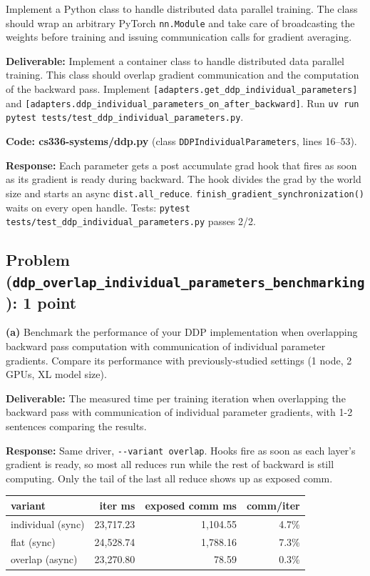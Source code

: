 \documentclass[11pt]{article}
\begin{document}
Implement a Python class to handle distributed data parallel training. The class should wrap an arbitrary PyTorch \texttt{nn.Module} and take care of broadcasting the weights before training and issuing communication calls for gradient averaging.

\textbf{Deliverable:} Implement a container class to handle distributed data parallel training. This class should overlap gradient communication and the computation of the backward pass. Implement \texttt{[adapters.get\_ddp\_individual\_parameters]} and \texttt{[adapters.ddp\_individual\_parameters\_on\_after\_backward]}. Run \texttt{uv run pytest tests/test\_ddp\_individual\_parameters.py}.

\textbf{Code: cs336-systems/ddp.py} (class \verb|DDPIndividualParameters|, lines 16--53).

\textbf{Response:} Each parameter gets a post accumulate grad hook that fires as soon as its gradient is ready during backward. The hook divides the grad by the world size and starts an async \verb|dist.all_reduce|. \verb|finish_gradient_synchronization()| waits on every open handle. Tests: \verb|pytest tests/test_ddp_individual_parameters.py| passes 2/2.

\subsection*{Problem (\texttt{ddp\_overlap\_individual\_parameters\_benchmarking}): 1 point}

\textbf{(a)} Benchmark the performance of your DDP implementation when overlapping backward pass computation with communication of individual parameter gradients. Compare its performance with previously-studied settings (1 node, 2 GPUs, XL model size).

\textbf{Deliverable:} The measured time per training iteration when overlapping the backward pass with communication of individual parameter gradients, with 1-2 sentences comparing the results.

\textbf{Response:}
Same driver, \verb|--variant overlap|. Hooks fire as soon as each layer's gradient is ready, so most all reduces run while the rest of backward is still computing. Only the tail of the last all reduce shows up as exposed comm.

\begin{table}[H]
\centering\small
\begin{tabular}{lrrr}
\toprule
variant & iter ms & exposed comm ms & comm/iter \\
\midrule
individual (sync) & 23{,}717.23 & 1{,}104.55 & 4.7\% \\
flat (sync)       & 24{,}528.74 & 1{,}788.16 & 7.3\% \\
overlap (async)   & 23{,}270.80 &     78.59  & 0.3\% \\
\bottomrule
\end{tabular}
\end{table}
\end{document}
